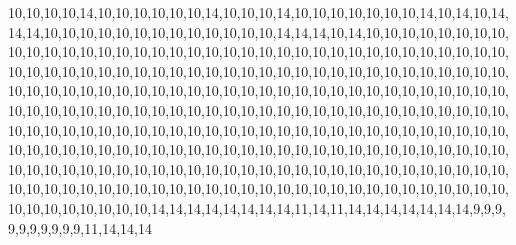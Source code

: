 10,10,10,10,14,10,10,10,10,10,10,14,10,10,10,14,10,10,10,10,10,10,10,14,10,14,10,14,14,14,10,10,10,10,10,10,10,10,10,10,10,10,10,14,14,14,10,14,10,10,10,10,10,10,10,10,10,10,10,10,10,10,10,10,10,10,10,10,10,10,10,10,10,10,10,10,10,10,10,10,10,10,10,10,10,10,10,10,10,10,10,10,10,10,10,10,10,10,10,10,10,10,10,10,10,10,10,10,10,10,10,10,10,10,10,10,10,10,10,10,10,10,10,10,10,10,10,10,10,10,10,10,10,10,10,10,10,10,10,10,10,10,10,10,10,10,10,10,10,10,10,10,10,10,10,10,10,10,10,10,10,10,10,10,10,10,10,10,10,10,10,10,10,10,10,10,10,10,10,10,10,10,10,10,10,10,10,10,10,10,10,10,10,10,10,10,10,10,10,10,10,10,10,10,10,10,10,10,10,10,10,10,10,10,10,10,10,10,10,10,10,10,10,10,10,10,10,10,10,10,10,10,10,10,10,10,10,10,10,10,10,10,10,10,10,10,10,10,10,10,10,10,10,10,10,10,10,10,10,10,10,10,10,10,10,10,10,10,10,10,10,10,10,10,10,10,10,10,10,10,10,10,10,10,10,10,10,10,14,14,14,14,14,14,14,14,11,14,11,14,14,14,14,14,14,14,9,9,9,9,9,9,9,9,9,9,11,14,14,14
